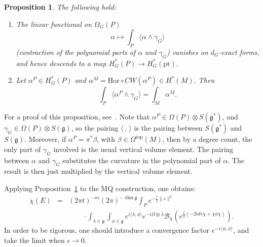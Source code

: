 \documentclass[a4paper,12pt,reqno,sumlimits]{amsart}
\theoremstyle{plain}
\newtheorem{prop}[thm]{Proposition}
\theoremstyle{definition}
\newcommand{\1}{{\bf 1}}
\newcommand{\g}{{\mathfrak  g}}
\newcommand{\ex}[1]{{e^{#1}}}
\newcommand{\calB}{{\mathcal B}}
\renewcommand{\to}{\longrightarrow}
\newcommand{\ip}[1]{\langle #1 \rangle}
\newcommand{\norm}[1]{\| #1 \|}
\numberwithin{equation}{section}
\begin{document}
\begin{prop}
  \label{propabove}
  The following hold:
  \begin{enumerate}
  \item The linear functional on $\Omega_G(P)$
    $$
    \alpha\mapsto\int_P\ip{\alpha\wedge\gamma_G}
    $$
    (contraction of the polynomial parts of $\alpha$ and $\gamma_G$)
    vanishes on $d_G$-exact forms, and hence descends to a map 
    $H^*_G(P)\to H^*_G(\text{pt})$.
  \item Let $\alpha^P\in H^*_G(P)$ and 
    $\alpha^M=\text{Hor}\circ CW(\alpha^P)\in H^*(M)$. Then
    $$
    \int_P\ip{\alpha^P\wedge\gamma_G} = \int_M\alpha^M.
    $$
  \end{enumerate}
\end{prop}
For a proof of this proposition, see~\cite{austin}.  Note that
$\alpha^P\in\Omega(P)\otimes S(\g^*)$, and $\gamma_G\in\Omega(P)\otimes
S(\g)$, so the pairing $\ip{\,,\,}$ is the pairing between $S(\g^*)$ and
$S(\g)$.  Moreover, if $\alpha^P=\pi^*\beta$, with
$\beta\in\Omega^{\text{top}}(M)$, then by a degree count, the only part of
$\gamma_G$ involved is the usual vertical volume element.  The pairing
between $\alpha$ and $\gamma_G$ substitutes the curvature in the polynomial
part of $\alpha$. The result is then just multiplied by the vertical volume
element.

Applying Proposition~\ref{propabove} to the MQ construction, one obtains:
\begin{eqnarray}
  \label{chiofE}
  \chi(E)&=&(2\pi t)^{-m}(2\pi)^{-\dim\g}\int_P\ex{-\frac{t}{2}\norm{s}^2}\nonumber\\
  &&\qquad\cdot\int_{\lambda\in\g}\int_{\phi\in\g}
  \ex{i\ip{\lambda,\phi}}\ex{-i\Omega\otimes\lambda}
  \calB_\chi\left(\ex{\frac{t}{2}(-2ids\chi+\chi\phi\chi)}\right).
\end{eqnarray}
In order to be rigorous, one should introduce a convergence factor
$\ex{-\epsilon\ip{\phi,\phi}}$, and take the limit when $\epsilon\to 0$.
\end{document}
